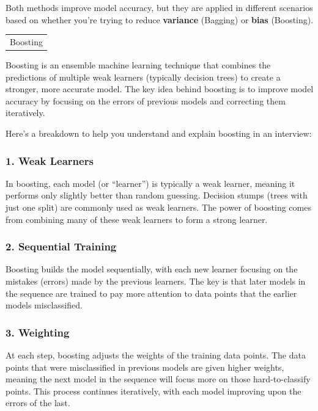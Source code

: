 \documentclass[12pt]{book}
\begin{document}
Both methods improve model accuracy, but they are applied in different
scenarios based on whether you're trying to reduce \textbf{variance}
(Bagging) or \textbf{bias} (Boosting).

\begin{longtable}[]{@{}l@{}}
\toprule\noalign{}
\endhead
\bottomrule\noalign{}
\endlastfoot
Boosting \\
\end{longtable}

Boosting is an ensemble machine learning technique that combines the
predictions of multiple weak learners (typically decision trees) to
create a stronger, more accurate model. The key idea behind boosting is
to improve model accuracy by focusing on the errors of previous models
and correcting them iteratively.

Here's a breakdown to help you understand and explain boosting in an
interview:

\subsubsection{\texorpdfstring{1. \textbf{Weak
Learners}}{1. Weak Learners}}\label{weak-learners}

In boosting, each model (or ``learner'') is typically a weak learner,
meaning it performs only slightly better than random guessing. Decision
stumps (trees with just one split) are commonly used as weak learners.
The power of boosting comes from combining many of these weak learners
to form a strong learner.

\subsubsection{\texorpdfstring{2. \textbf{Sequential
Training}}{2. Sequential Training}}\label{sequential-training}

Boosting builds the model sequentially, with each new learner focusing
on the mistakes (errors) made by the previous learners. The key is that
later models in the sequence are trained to pay more attention to data
points that the earlier models misclassified.

\subsubsection{\texorpdfstring{3.
\textbf{Weighting}}{3. Weighting}}\label{weighting}

At each step, boosting adjusts the weights of the training data points.
The data points that were misclassified in previous models are given
higher weights, meaning the next model in the sequence will focus more
on those hard-to-classify points. This process continues iteratively,
with each model improving upon the errors of the last.
\end{document}
